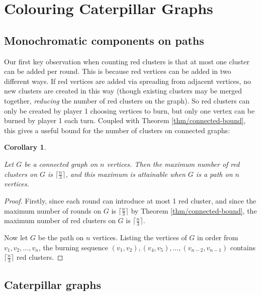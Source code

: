 \documentclass{mpaper}
\newtheorem{corollary}{Corollary}[section]
\begin{document}
\section{Colouring Caterpillar Graphs}

\subsection{Monochromatic components on paths}

Our first key observation when counting red clusters is that at most one cluster can be added per round. This is because red vertices can be added in two different ways. If red vertices are added via spreading from adjacent vertices, no new clusters are created in this way (though existing clusters may be merged together, \emph{reducing} the number of red clusters on the graph). So red clusters can only be created by player 1 choosing vertices to burn, but only one vertex can be burned by player 1 each turn. Coupled with Theorem \ref{thm/connected-bound}, this gives a useful bound for the number of clusters on connected graphs:

\begin{corollary}
  \label{cor/path-clusters}

  Let $G$ be a connected graph on $n$ vertices. Then the maximum number of red clusters on $G$ is $\lceil \frac{n}{3} \rceil$, and this maximum is attainable when $G$ is a path on $n$ vertices.

\end{corollary}

\begin{proof}

Firstly, since each round can introduce at most 1 red cluster, and since the maximum number of rounds on $G$ is $\lceil \frac{n}{3} \rceil$ by Theorem \ref{thm/connected-bound}, the maximum number of red clusters on $G$ is $\lceil \frac{n}{3} \rceil$.

Now let $G$ be the path on $n$ vertices. Listing the vertices of $G$ in order from $v_1, v_2, \dots, v_n$, the burning sequence $(v_1, v_2), (v_4, v_5), \dots, (v_{n-2}, v_{n-1})$ contains $\lceil \frac{n}{3} \rceil$ red clusters.


\end{proof}

\subsection{Caterpillar graphs}
\end{document}
